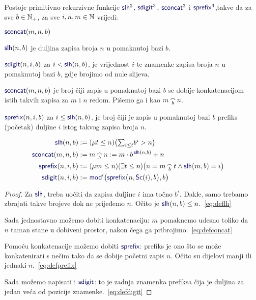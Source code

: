 \begin{lema}[{name=[rad sa zapisima u pomaknutoj bazi]}]\label{lm:ldcpprn}
Postoje primitivno rekurzivne funkcije $\f{slh}^2$\!, $\f{sdigit}^3$\!, $\f{sconcat}^3$ i $\f{sprefix}^3$,\newline takve da za sve $b\in{\mathbb N}_+$, za sve $i,n,m\in{\mathbb N}$ vrijedi:
\begin{labeling}{$\f{sconcat}(m,n,b)$}
    \item[$\f{slh}(n,b)$] je duljina zapisa broja $n$ u pomaknutoj bazi $b$. \item[$\f{sdigit}(n,i,b)$] za $i<\f{slh}(n,b)$, je vrijednost $i$-te znamenke zapisa broja $n$ u pomaknutoj bazi $b$, gdje brojimo od nule slijeva.
    \item[$\f{sconcat}(m,n,b)$] je broj čiji zapis u pomaknutoj bazi $b$ se dobije konkatenacijom istih takvih zapisa za $m$ i $n$ redom. Pišemo ga i kao $m\conc bn$.
    \item[$\f{sprefix}(n,i,b)$] za $i\le\f{slh}(n,b)$, je broj čiji je zapis u pomaknutoj bazi $b$ prefiks (početak) duljine $i$ istog takvog zapisa broja $n$.
\end{labeling}
\end{lema}
\noindent\begin{align}
\label{eq:deflh}
    \f{slh}(n,b)&:=(\mu t\le n)\big(\!
    \textstyle\sum_{i\le t}\!b^i>n
    \big)\\
\label{eq:defconcat}
    \f{sconcat}(m,n,b)&:=m\conc bn:=m\cdot b^{\,\f{slh}(n,b)}+n\\
\label{eq:defprefix}
    \f{sprefix}(n,i,b)&:=(\mu m\le n)(\exists t\le n)\bigl(n=m\conc bt\land\f{slh}(m,b)=i\bigr)\\
\label{eq:defdigit}
    \f{sdigit}(n,i,b)&:=\f{mod}'\bigl(\f{sprefix}\bigl(n,\f{Sc}(i),b\bigr),b\bigr)
\end{align}
\begin{proof}
Za $\f{slh}$, treba uočiti da zapisa duljine $i$ ima točno $b^i$. Dakle, samo trebamo zbrajati takve brojeve dok ne prijeđemo $n$. Očito je $\f{slh}(n,b)\le n$.~\eqref{eq:deflh}

Sada jednostavno možemo dobiti konkatenaciju: $m$ pomaknemo udesno toliko da $n$ taman stane u dobiveni prostor, nakon čega ga pribrojimo.~\eqref{eq:defconcat}

Pomoću konkatenacije možemo dobiti $\f{sprefix}$: prefiks je ono što se može konkatenirati s nečim tako da se dobije početni zapis $n$. Očito su dijelovi manji ili jednaki $n$.~\eqref{eq:defprefix} %

Sada možemo napisati i $\f{sdigit}$: to je zadnja znamenka prefiksa čija je duljina za jedan veća od pozicije znamenke.~\eqref{eq:defdigit}
\end{proof}

